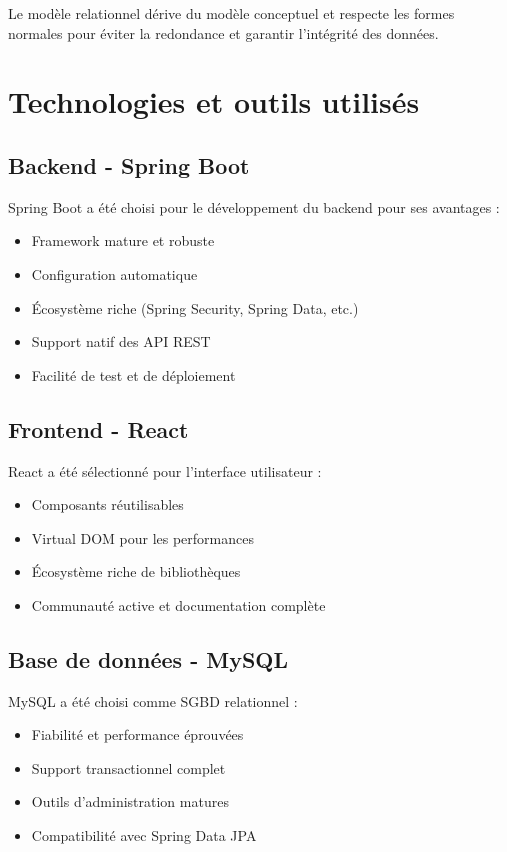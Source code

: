\documentclass[12pt,a4paper]{report}
\begin{document}
Le modèle relationnel dérive du modèle conceptuel et respecte les formes normales pour éviter la redondance et garantir l'intégrité des données.

\section{Technologies et outils utilisés}

\subsection{Backend - Spring Boot}

Spring Boot a été choisi pour le développement du backend pour ses avantages :

\begin{itemize}
    \item Framework mature et robuste
    \item Configuration automatique
    \item Écosystème riche (Spring Security, Spring Data, etc.)
    \item Support natif des API REST
    \item Facilité de test et de déploiement
\end{itemize}

\subsection{Frontend - React}

React a été sélectionné pour l'interface utilisateur :

\begin{itemize}
    \item Composants réutilisables
    \item Virtual DOM pour les performances
    \item Écosystème riche de bibliothèques
    \item Communauté active et documentation complète
\end{itemize}

\subsection{Base de données - MySQL}

MySQL a été choisi comme SGBD relationnel :

\begin{itemize}
    \item Fiabilité et performance éprouvées
    \item Support transactionnel complet
    \item Outils d'administration matures
    \item Compatibilité avec Spring Data JPA
\end{itemize}
\end{document}
